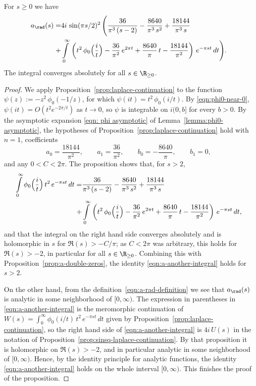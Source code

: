 \begin{proposition}\label{prop:a-another-integral}
For $s\geq0$ we have
\begin{align}\label{eqn:a-another-integral}a_\rad(s)=&4i\,\sin(\pi s/2)^2\,\Bigg(\frac{36}{\pi^3\,(s-2)}-\frac{8640}{\pi^3\,s^2}+\frac{18144}{\pi^3\,s}\\ +&\int\limits_0^\infty\,\left(t^2\,\phi_0\Big(\frac{i}{t}\Big)-\frac{36}{\pi^2}\,e^{2\pi t}+\frac{8640}{\pi}\,t-\frac{18144}{\pi^2}\right)\,e^{-\pi s t}\,dt \Bigg) .\notag\end{align}
The integral converges absolutely for all $s\in\R_{\geq 0}$.
\end{proposition}
\begin{proof}
We apply Proposition~\ref{prop:laplace-continuation} to the function $\psi(z) := -z^2\,\phi_0(-1/z)$, for which $\psi(it) = t^2\,\phi_0(i/t)$.
By \eqref{eqn:phi0-near-0}, $\psi(it) = O(t^2 e^{-2\pi/t})$ as $t \to 0$, so $\psi$ is integrable on $i(0, b]$ for every $b > 0$.
By the asymptotic expansion \eqref{eqn: phi asymptotic} of Lemma~\ref{lemma:phi0-asymptotic}, the hypotheses of Proposition~\ref{prop:laplace-continuation} hold with $n = 1$, coefficients
\[
a_0 = \frac{18144}{\pi^2}, \qquad a_1 = \frac{36}{\pi^2}, \qquad b_0 = -\frac{8640}{\pi}, \qquad b_1 = 0,
\]
and any $0 < C < 2\pi$. The proposition shows that, for $s > 2$,
\begin{align}
\int\limits_{0}^{\infty}\phi_0\Big(\frac{i}{t}\Big)\,t^2\,e^{-\pi s t}\,dt
=&\frac{36}{\pi^3\,(s-2)}-\frac{8640}{\pi^3\,s^2}+\frac{18144}{\pi^3\,s}\notag\\
+&\int\limits_0^\infty\,\left(t^2\,\phi_0\Big(\frac{i}{t}\Big)-\frac{36}{\pi^2}\,e^{2\pi t}+\frac{8640}{\pi}\,t-\frac{18144}{\pi^2}\right)\,e^{-\pi s t}\,dt,\notag
\end{align}
and that the integral on the right hand side converges absolutely and is holomorphic in $s$ for $\Re(s) > -C/\pi$; as $C < 2\pi$ was arbitrary, this holds for $\Re(s) > -2$, in particular for all $s \in \R_{\geq 0}$.
Combining this with Proposition~\ref{prop:a-double-zeros}, the identity \eqref{eqn:a-another-integral} holds for $s>2$.

On the other hand, from the definition~\eqref{eqn:a-rad-definition} we see that $a_\rad(s)$ is analytic in some neighborhood of $[0,\infty)$.
The expression in parentheses in \eqref{eqn:a-another-integral} is the meromorphic continuation of $W(s) = \int_0^\infty \phi_0(i/t)\,t^2\,e^{-\pi s t}\,dt$ given by Proposition~\ref{prop:laplace-continuation}, so the right hand side of \eqref{eqn:a-another-integral} is $4i\,U(s)$ in the notation of Proposition~\ref{prop:sinsq-laplace-continuation}. By that proposition it is holomorphic on $\Re(s) > -2$, and in particular analytic in some neighborhood of $[0,\infty)$. Hence, by the identity principle for analytic functions, the identity \eqref{eqn:a-another-integral} holds on the whole interval $[0,\infty)$. This finishes the proof of the proposition.
\end{proof}
